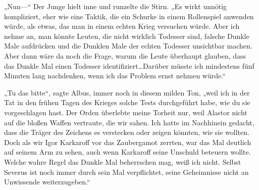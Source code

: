 „Nun—“ Der Junge hielt inne und runzelte die Stirn. „Es wirkt unnötig kompliziert, eher wie eine Taktik, die ein Schurke in einem Rollenspiel anwenden würde, als etwas, das man in einem echten Krieg versuchen würde. Aber ich nehme an, man könnte Leuten, die nicht wirklich Todesser sind, falsche Dunkle Male aufdrücken und die Dunklen Male der echten Todesser unsichtbar machen. Aber dann wäre da noch die Frage, warum die Leute überhaupt glauben, dass das Dunkle Mal einen Todesser identifiziert…Darüber müsste ich mindestens fünf Minuten lang nachdenken, wenn ich das Problem ernst nehmen würde.“

„Tu das bitte“, sagte Albus, immer noch in diesem milden Ton, „weil ich in der Tat in den frühen Tagen des Krieges solche Tests durchgeführt habe, wie du sie vorgeschlagen hast. Der Orden überlebte meine Torheit nur, weil Alastor nicht auf die bloßen Waffen vertraute, die wir sahen. Ich hatte im Nachhinein gedacht, dass die Träger des Zeichens es verstecken oder zeigen könnten, wie sie wollten. Doch als wir Igor Karkaroff vor das Zaubergamot zerrten, war das Mal deutlich auf seinem Arm zu sehen, auch wenn Karkaroff seine Unschuld beteuern wollte. Welche wahre Regel das Dunkle Mal beherrschen mag, weiß ich nicht. Selbst Severus ist noch immer durch sein Mal verpflichtet, seine Geheimnisse nicht an Unwissende weiterzugeben.“

